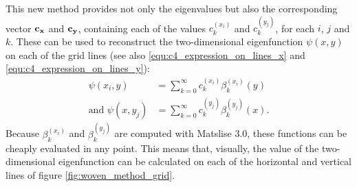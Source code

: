 This new method provides not only the eigenvalues but also the corresponding vector $\vb{c_x}$ and $\vb{c_y}$, containing each of the values $c_k^{(x_i)}$ and $c_k^{(y_j)}$, for each $i$, $j$ and $k$. These can be used to reconstruct the two-dimensional eigenfunction $\psi(x, y)$ on each of the grid lines (see also \eqref{equ:c4_expression_on_lines_x} and \eqref{equ:c4_expression_on_lines_y}):
\begin{align*}
    \psi(x_i, y)             & = \sum_{k=0}^\infty c_k^{(x_i)} \beta_k^{(x_i)}(y)          \\
    \text{and } \psi(x, y_j) & = \sum_{k=0}^\infty c_k^{(y_j)} \beta_k^{(y_j)}(x) \text{.}
\end{align*}
Because $\beta_k^{(x_i)}$ and $\beta_k^{(y_j)}$ are computed with Matslise 3.0, these functions can be cheaply evaluated in any point. This means that, visually, the value of the two-dimensional eigenfunction can be calculated on each of the horizontal and vertical lines of figure \ref{fig:woven_method_grid}.

